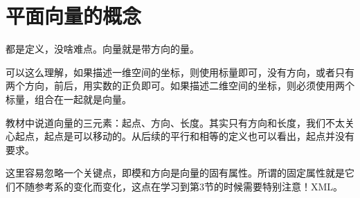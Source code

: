\section{平面向量的概念}

都是定义，没啥难点。向量就是带方向的量。

可以这么理解，如果描述一维空间的坐标，则使用标量即可，没有方向，或者只有两个方向，前后，用实数的正负即可。如果描述二维空间的坐标，则必须使用两个标量，组合在一起就是向量。

教材中说道向量的三元素：起点、方向、长度。其实只有方向和长度，我们不太关心起点，起点是可以移动的。从后续的平行和相等的定义也可以看出，起点并没有要求。

这里容易忽略一个关键点，即模和方向是向量的固有属性。所谓的固定属性就是它们不随参考系的变化而变化，这点在学习到第3节的时候需要特别注意！XML。




